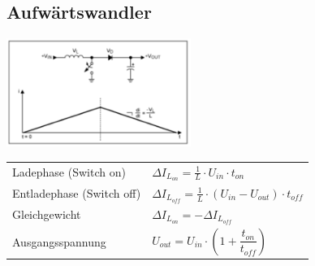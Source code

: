 \subsection{Aufwärtswandler}
	\begin{minipage}{6cm}
		\includegraphics[width=6cm]{./images/schaltregler/05_boost-verhalten}
	\end{minipage}
	\begin{minipage}{12cm}
		\begin{tabular}{p{150pt} p{150pt} }
			Ladephase (Switch on)  & $\Delta I_{L_{on}}  = \frac{1}{L} \cdot U_{in} \cdot t_{on}$ \\
			Entladephase (Switch off) &$ \Delta I_{L_{off}} = \frac{1}{L} \cdot \left(U_{in}-U_{out}\right) \cdot t_{off} $\\
			Gleichgewicht &$ \Delta I_{L_{on}}  = -\Delta I_{L_{off}} $\\
			Ausgangsspannung	&$ U_{out}  = U_{in} \cdot \left( 1+\dfrac{t_{on}}{t_{off}}\right)$\\
		\end{tabular}
	\end{minipage}
	
